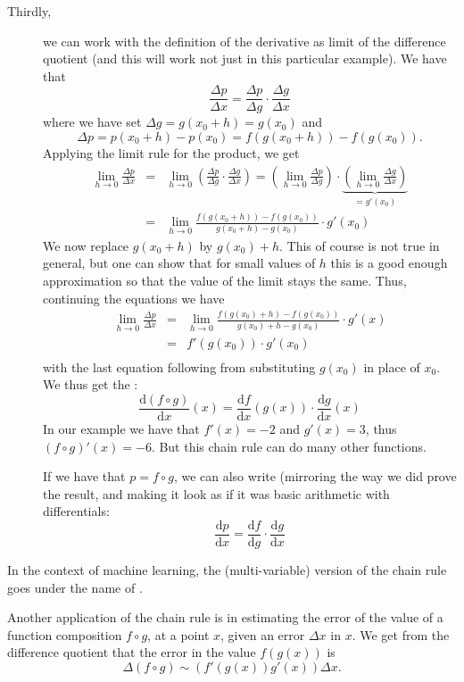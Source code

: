 \begin{description}
\item[Thirdly,] we can work with the definition of the derivative as limit
of the difference quotient (and this
will work not just in this particular example). We have that
\[
\frac{\Delta p}{\Delta x}=\frac{\Delta p}{\Delta g}\cdot\frac{\Delta
g}{\Delta x}
\]
where we have set $\Delta g=g(x_0+h)=g(x_0)$ and
\[
\Delta p=p(x_0+h)-p(x_0)=f(g(x_0+h))-f(g(x_0)).
\]
Applying the limit rule for the product, we get
\begin{eqnarray*}
\lim_{h\to 0} \frac{\Delta p}{\Delta x}
&=&\lim_{h\to 0}\left(\frac{\Delta p}{\Delta g}\cdot\frac{\Delta g}{\Delta x}\right)
=\left(\lim_{h\to 0}\frac{\Delta p}{\Delta g}\right)\cdot\underbrace{\left(\lim_{h\to 0}\frac{\Delta
g}{\Delta x}\right)}_{=g'(x_0)}\\
&=&\lim_{h\to 0}\frac{f(g(x_0+h))-f(g(x_0))}{g(x_0+h)-g(x_0)}\cdot g'(x_0)
\end{eqnarray*}
We now replace $g(x_0+h)$ by $g(x_0)+h$. This of course is not true in
general, but one can show that for small values of $h$ this is a good
enough approximation so that the value of the limit stays the same. Thus,
continuing the equations we have
\begin{eqnarray*}
\lim_{h\to 0} \frac{\Delta p}{\Delta x}
&=&\lim_{h\to 0}\frac{f(g(x_0)+h)-f(g(x_0))}{g(x_0)+h-g(x_0)}\cdot g'(x)\\
&=&f'(g(x_0))\cdot g'(x_0)\\
\end{eqnarray*}
with the last equation following from substituting $g(x_0)$ in place of
$x_0$. We thus get the :
\[
\frac{\mbox{d}(f\circ
g)}{\mbox{d}x}(x)=\frac{\mbox{d}f}{\mbox{d}x}(g(x))\cdot
\frac{\mbox{d}g}{\mbox{d}x}(x)
\]
In our example we have that $f'(x)=-2$ and $g'(x)=3$, thus $(f\circ
g)'(x)=-6$. But this chain rule can do many other functions.
\smallskip

If we have that $p=f\circ g$, we can also write (mirroring the way we did
prove the result, and making it look as if it was basic arithmetic with
differentials:
\[
\frac{\mbox{d}p}{\mbox{d}x}=
\frac{\mbox{d}f}{\mbox{d}g}\cdot \frac{\mbox{d}g}{\mbox{d}x}
\]
\end{description}
In the context of machine learning, the (multi-variable) version of the
chain rule goes under the name of .
\smallskip

Another application of the chain rule is in estimating the error of the value of a function
composition $f\circ g$, at a point $x$, given an error $\Delta x$ in $x$. We
get from the difference quotient that the error in the value $f(g(x))$ is
\[
\Delta(f\circ g)\sim\left(f'(g(x))g'(x)\right)\Delta x.
\]

